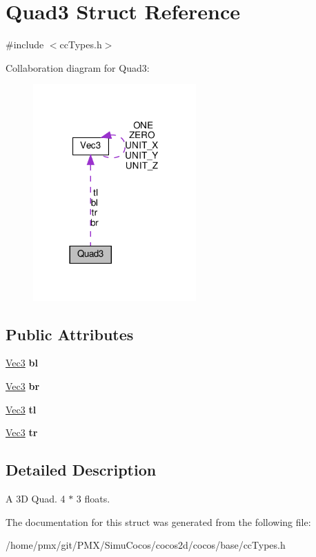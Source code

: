\hypertarget{structQuad3}{}\section{Quad3 Struct Reference}
\label{structQuad3}


{\ttfamily \#include $<$cc\+Types.\+h$>$}



Collaboration diagram for Quad3\+:
\nopagebreak
\begin{figure}[H]
\begin{center}
\leavevmode
\includegraphics[width=177pt]{structQuad3__coll__graph}
\end{center}
\end{figure}
\subsection*{Public Attributes}
\begin{DoxyCompactItemize}
\item 
\mbox{\label{structQuad3_aa48b33c1e0c4b63b8bb8914bc3617820}} 
\hyperlink{classVec3}{Vec3} {\bfseries bl}
\item 
\mbox{\label{structQuad3_abe0e636f70a3d358a0baa27e3f2fa2ca}} 
\hyperlink{classVec3}{Vec3} {\bfseries br}
\item 
\mbox{\label{structQuad3_a691367cba71eb17ec26f3bfa310497b0}} 
\hyperlink{classVec3}{Vec3} {\bfseries tl}
\item 
\mbox{\label{structQuad3_a2def44d2ac8f4d9e5fcc345e63e0f5ea}} 
\hyperlink{classVec3}{Vec3} {\bfseries tr}
\end{DoxyCompactItemize}


\subsection{Detailed Description}
A 3D Quad. 4 $\ast$ 3 floats. 

The documentation for this struct was generated from the following file\+:\begin{DoxyCompactItemize}
\item 
/home/pmx/git/\+P\+M\+X/\+Simu\+Cocos/cocos2d/cocos/base/cc\+Types.\+h\end{DoxyCompactItemize}
